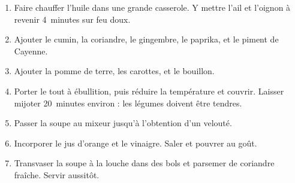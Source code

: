 
\begin{ingredients}
\end{ingredients}


\begin{recipe}
  \begin{enumerate}

  \item Faire chauffer l'huile dans une grande casserole.  Y mettre
    l'ail et l'oignon \`a revenir 4~minutes sur feu doux.

  \item Ajouter le cumin, la coriandre, le gingembre, le paprika, et
    le piment de Cayenne.

  \item Ajouter la pomme de terre, les carottes, et le bouillon.

  \item Porter le tout \`a \'ebullition, puis r\'eduire la
    temp\'erature et couvrir.  Laisser mijoter 20~minutes environ :
    les l\'egumes doivent \^etre tendres.

  \item Passer la soupe au mixeur jusqu'\`a l'obtention d'un
    velout\'e.

  \item Incorporer le jus d'orange et le vinaigre.  Saler et pouvrer
    au go\^ut.

  \item Transvaser la soupe \`a la louche dans des bols et parsemer de
    coriandre fra\^iche.  Servir aussit\^ot.

  \end{enumerate}
\end{recipe}
